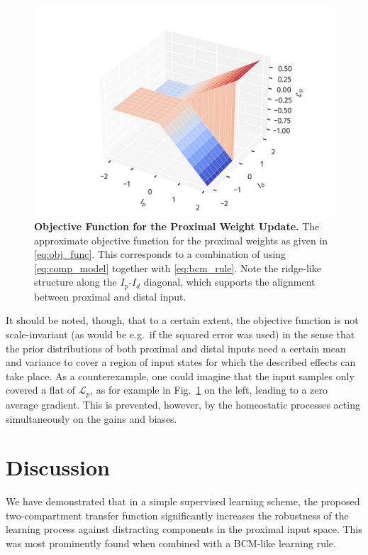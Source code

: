 \documentclass[utf8]{frontiersSCNS} %
\begin{document}
\begin{figure}
\centering
\includegraphics[width=0.7\columnwidth]{obj_func}
\caption{{\bf Objective Function for the Proximal Weight Update.} The 
	approximate objective function for the proximal weights as given in
	\eqref{eq:obj_func}. This corresponds to a combination of using 
	\eqref{eq:comp_model} together with \eqref{eq:bcm_rule}. Note the ridge-like
	structure along the $I_p$-$I_d$ diagonal, which supports the alignment between
	proximal and distal input.}
\label{fig:obj_func}
\end{figure}

It should be noted, though, that to a certain extent, the objective 
function is not scale-invariant (as would be e.g.\ if 
the squared error was used) in the sense 
that the prior distributions of both proximal 
and distal inputs need a certain mean and variance to cover a region of input
states for which the described effects can take place. 
As a counterexample, one could imagine that the input samples 
only covered a flat of $\mathcal{L}_p$, as for example in 
Fig.~\ref{fig:obj_func} on the left, leading to a zero average gradient. 
This is prevented, however, by the homeostatic processes 
acting simultaneously on the gains
and biases.

\section{Discussion}

We have demonstrated that in a simple supervised learning scheme, the
proposed two-compartment transfer function significantly increases
the robustness of the learning process against distracting components
in the proximal input space. This was most prominently found when
combined with a BCM-like learning rule.
\end{document}
